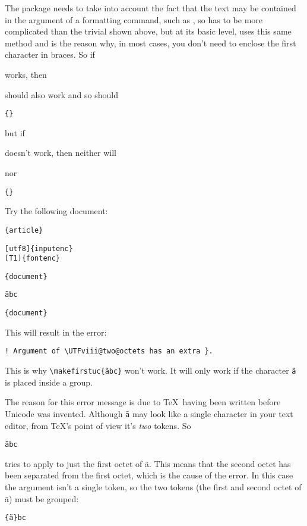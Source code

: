 \documentclass{nlctdoc}
\begin{document}
The  package needs to take into account the fact
that the text may be contained in the argument of a formatting
command, such as , so  has to be
more complicated than the trivial  shown above, but at
its basic level,  uses this same method and is the
reason why, in most cases, you don't need to enclose the first
character in braces. So if 
\begin{alltt}
 
\end{alltt}
works,
then
\begin{alltt}
\end{alltt}
should also work and so should
\begin{alltt}
\{\}
\end{alltt}
but if 
\begin{alltt}
 
\end{alltt}
doesn't work, then neither will
\begin{alltt}
\end{alltt}
nor
\begin{alltt}
\{\}
\end{alltt}

Try the following document:
\begin{alltt}
\{article\}

[utf8]\{inputenc\}
[T1]\{fontenc\}

\{document\}

 \~abc

\{document\}
\end{alltt}

This will result in the error:
\begin{verbatim}
! Argument of \UTFviii@two@octets has an extra }.
\end{verbatim}
This is why \verb|\makefirstuc{|\texttt{\~abc}\verb|}| won't work.
It will only work if the character \texttt{\~a} is placed inside a
group.

The reason for this error message is due to \TeX\ having been written before
Unicode was invented. Although \texttt{\~a} may look like a single
character in your text editor, from \TeX's point of view it's \emph{two} 
tokens. So
\begin{alltt}
 \~abc
\end{alltt}
tries to apply  to just the first octet of \~a.
This means that the second octet has been separated from the first octet,
which is the cause of the error. In this case the argument isn't a
single token, so the two tokens (the first and second octet of \~a)
must be grouped:
\begin{alltt}
\{\~a\}bc
\end{alltt}
\end{document}
